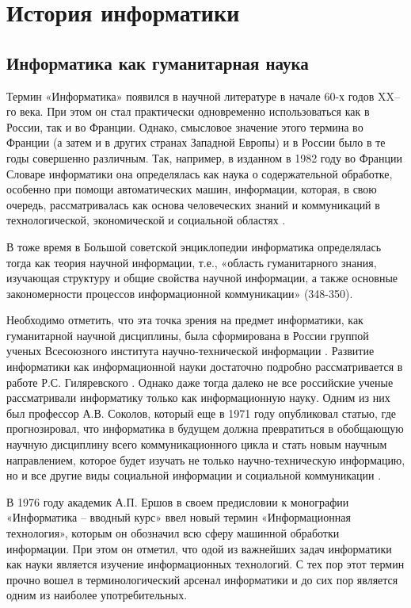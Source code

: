 \newpage

\section{История информатики} \label{sect1_2}

\subsection{Информатика как гуманитарная наука} \label{subsect1_2_1}

Термин «Информатика» появился в научной литературе в начале 60-х годов XX–го века. При этом он стал практически одновременно использоваться как в России, так и во Франции. Однако, смысловое значение этого термина во Франции (а затем и в других странах Западной Европы) и в России было в те годы совершенно различным. Так, например, в изданном в 1982 году во Франции Словаре информатики она определялась как наука о содержательной обработке, особенно при помощи автоматических машин, информации, которая, в свою очередь, рассматривалась как основа человеческих знаний и коммуникаций в технологической, экономической и социальной областях \cite{bib202}.

В тоже время в Большой советской энциклопедии информатика определялась тогда как теория научной информации, т.е., «область гуманитарного знания, изучающая структуру и общие свойства научной информации, а также основные закономерности процессов информационной коммуникации» \cite{bib203}(348-350). 

Необходимо отметить, что эта точка зрения на предмет информатики, как гуманитарной научной дисциплины, была сформирована в России группой ученых Всесоюзного института научно-технической информации \cite{bib204,bib205}. Развитие информатики как информационной науки достаточно подробно рассматривается в работе Р.С. Гиляревского \cite{bib206}.  Однако даже тогда далеко не все российские ученые рассматривали информатику только как информационную науку. Одним из них был профессор А.В. Соколов, который еще в 1971 году опубликовал статью, где прогнозировал, что информатика в будущем должна превратиться в обобщающую научную дисциплину всего коммуникационного цикла  и стать новым научным направлением, которое будет изучать не только научно-техническую информацию, но и все другие виды социальной информации и социальной коммуникации \cite{bib207}.

       В 1976 году академик А.П. Ершов в своем предисловии к монографии «Информатика – вводный курс» ввел новый термин «Информационная технология», которым он обозначил всю сферу машинной обработки информации. При этом он отметил, что одой из важнейших задач информатики как науки является изучение информационных технологий. С тех пор этот термин прочно вошел в терминологический арсенал информатики и до сих пор является одним из наиболее употребительных.


